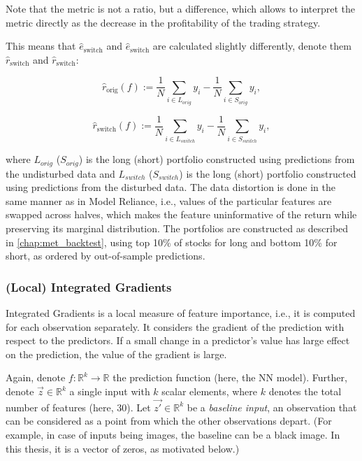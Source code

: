 			Note that the metric is not a ratio, but a difference, which allows to interpret the metric directly as the decrease in the profitability of the trading strategy.   
			
			This means that $\hat{e}_{\text{switch}}$ and $\hat{e}_{\text{switch}}$ are calculated slightly differently, denote them $\hat{r}_{\text{switch}}$ and $\hat{r}_{\text{switch}}$:
							
			\begin{equation*}
				\hat{r}_{\text{orig}}(f):= \frac{1}{N} \sum_{i \in L_{orig}} y_i - \frac{1}{N} \sum_{i \in S_{orig}} y_i, 
			\end{equation*}
		
			\begin{equation*}
				\hat{r}_{\text{switch}}(f):= \frac{1}{N} \sum_{i \in L_{switch}} y_i - \frac{1}{N} \sum_{i \in S_{switch}} y_i, 
			\end{equation*}
			
			where $L_{orig}$ ($S_{orig}$) is the long (short) portfolio constructed using predictions from the undisturbed data and $L_{switch}$ ($S_{switch}$) is the long (short) portfolio constructed using predictions from the disturbed data. The data distortion is done in the same manner as in Model Reliance, i.e., values of the particular features are swapped across halves, which makes the feature uninformative of the return while preserving its marginal distribution. The portfolios are constructed as described in \ref{chap:met_backtest}, using top 10\% of stocks for long and bottom 10\% for short, as ordered by out-of-sample predictions. 
			   
			
		\subsubsection{(Local) Integrated Gradients}
			\label{chap:integrated_gradient}
			Integrated Gradients \citep{sundararajan2017axiomatic} is a local measure of feature importance, i.e., it is computed for each observation separately. It considers the gradient of the prediction with respect to the predictors. If a small change in a predictor's value has large effect on the prediction, the value of the gradient is large.
			
			Again, denote $f: \mathbb{R}^k \rightarrow \mathbb{R}$ the prediction function (here, the NN model). Further, denote $\vec{z} \in  \mathbb{R}^k$ a single input with $k$ scalar elements, where $k$ denotes the total number of features (here, 30). Let $\vec{z'} \in  \mathbb{R}^k$ be a \textit{baseline input}, an observation that can be considered as a point from which the other observations depart. (For example, in case of inputs being images, the baseline can be a black image. In this thesis, it is a vector of zeros, as motivated below.) 
			
